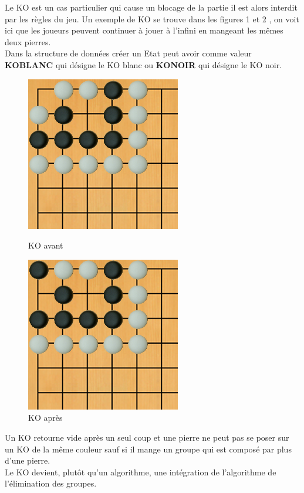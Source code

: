     Le KO est un cas particulier qui cause un blocage de la partie il est alors interdit par les règles du jeu.
    Un exemple de KO se trouve dans les figures 1 et 2 , on voit ici que les joueurs peuvent continuer à jouer à l'infini en mangeant les mêmes deux pierres.\\
    Dans la structure de données créer un Etat peut avoir comme valeur \textbf{KOBLANC} qui désigne le KO blanc ou \textbf{KONOIR} qui désigne le KO noir.\\
    \begin{figure}[h!]
    \centering
    \includegraphics[scale=0.30]{figures/experiments/ko1.png}
    \caption{KO avant}
    \label{fig:button}
        
    \includegraphics[scale=0.30]{figures/experiments/ko2.png}
    \caption{KO après}
    \label{fig:button}
    \end{figure}
    Un KO retourne vide après un seul coup et une pierre ne peut pas se poser sur un KO de la même couleur sauf si il mange un groupe qui est composé par plus d'une pierre.\\
    Le KO devient, plutôt qu'un algorithme, une intégration de l'algorithme de l'élimination des groupes.\\
                
